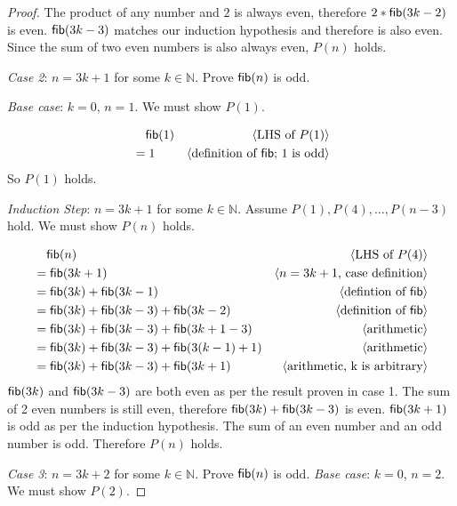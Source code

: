 \documentclass[11pt,fleqn]{article}
\newcommand{\mname}[1]{\mbox{\sf #1}}
\newcommand{\pnote}[1]{{\langle \text{#1} \rangle}}
\begin{document}
\begin{enumerate}
\begin{proof}
  The product of any number and $2$ is always even, therefore $2 * \mname{fib}(3k-2)$
  is even. $\mname{fib}(3k-3)$ matches our induction hypothesis and therefore is also
  even. Since the sum of two even numbers is also always even, $P(n)$ holds.

  \newpage

  \emph{Case 2}: $n = 3k + 1$ for some $k \in \mathbb{N}$. Prove
  $\mname{fib}(n)$ is odd.
  
  \emph{Base case}: $k = 0$, $n = 1$. We must show $P(1)$.

  \begin{align*}
  &\phantom{{}=} \mname{fib}(1) & \pnote{LHS of $P(1)$}\\
  &= 1 & \pnote{definition of $\mname{fib}$; $1$ is odd}
  \end{align*}
  So $P(1)$ holds.

  \emph{Induction Step}: $n = 3k + 1$ for some $k \in \mathbb{N}$. Assume $P(1),P(4),\dots,P(n - 3)$ hold. We must
  show $P(n)$ holds.

  \begin{align*}
  &\phantom{{}=}  \mname{fib}(n) & \pnote{LHS of $P(4)$}\\
  &= \mname{fib}(3k + 1) & \pnote{$n = 3k + 1$, case definition}\\
  &= \mname{fib}(3k) + \mname{fib}(3k -1) & \pnote{defintion of $\mname{fib}$}\\
  &= \mname{fib}(3k) + \mname{fib}(3k - 3) + \mname{fib}(3k - 2) & \pnote{definition of $\mname{fib}$}\\
  &= \mname{fib}(3k) + \mname{fib}(3k - 3) + \mname{fib}(3k + 1 - 3) & \pnote{arithmetic}\\
  &= \mname{fib}(3k) + \mname{fib}(3k - 3) + \mname{fib}(3(k -1) + 1) & \pnote{arithmetic}\\
  &= \mname{fib}(3k) + \mname{fib}(3k - 3) + \mname{fib}(3k + 1) & \pnote{arithmetic, k is arbitrary}\\
  \end{align*}
  $\mname{fib}(3k)$ and $\mname{fib}(3k - 3)$ are both even as per the result
  proven in case 1. The sum of 2 even numbers is still even, therefore $\mname{fib}(3k) + \mname{fib}(3k - 3)$
  is even. $\mname{fib}(3k + 1)$ is odd as per the induction hypothesis. The sum 
  of an even number and an odd number is odd. Therefore $P(n)$ holds.

 \newpage

 \emph{Case 3}: $n = 3k + 2$ for some $k \in \mathbb{N}$. Prove $\mname{fib}(n)$
 is odd.
 \emph{Base case}: $k = 0$, $n = 2$. We must show $P(2)$.


\end{proof}
\end{enumerate}
\end{document}
